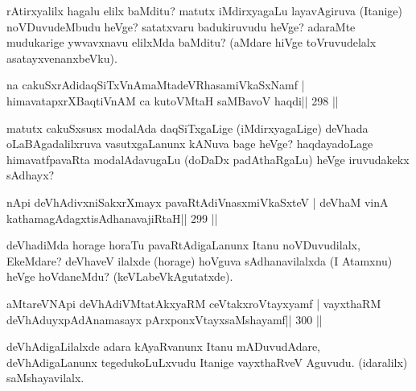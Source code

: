 \begin{artha}
rAtirxyalilx hagalu elilx baMditu? matutx iMdirxyagaLu layavAgiruva (Itanige) noVDuvudeMbudu heVge? satatxvaru badukiruvudu heVge? adaraMte mudukarige ywvavxnavu elilxMda baMditu? (aMdare hiVge toVruvudelalx asatayxvenanxbeVku).
\end{artha}


\begin{shl}
na cakuSxrAdidaqSiTxVnAmaMtadeVRhasamiVkaSxNamf |
himavatapxrXBaqtiVnAM ca kutoV\s MtaH saMBavoV haqdi\hfill || 298 ||
\end{shl}

\begin{artha}
matutx cakuSxsusx modalAda daqSiTxgaLige (iMdirxyagaLige) deVhada oLaBAga\-dalilxruva vasutxgaLanunx kANuva bage heVge? haqdayadoLage himavatfpavaRta modalAdavugaLu (doDaDx padAthaRgaLu) heVge iruvudakekx sAdhayx?
\end{artha}


\begin{shl}
nApi deVhAdivxniSakxrXmayx pavaRtAdiVnasxmiVkaSxteV |
deVhaM vinA kathamagAdagxtisAdhanavajiRtaH\hfill || 299 ||
\end{shl}

\begin{artha}
deVhadiMda horage horaTu pavaRtAdigaLanunx Itanu noVDuvudilalx, EkeMdare? deVhaveV ilalxde (horage) hoVguva sAdhanavilalxda (I Atamxnu) heVge hoVdaneMdu? (keVLabeVkAgutatxde).
\end{artha}


\begin{shl}
aMtareVNApi deVhAdiVMtatAkxyaRM ceVtakxroVtayxyamf |
vayxthaRM deVhAduyxpAdAnamasayx pArxponxVtayxsaMshayamf\hfill || 300 ||
\end{shl}

\begin{artha}
deVhAdigaLilalxde adara kAyaRvanunx Itanu mADuvudAdare, deVhAdi\-gaLanunx tegedukoLuLxvudu Itanige vayxthaRveV Aguvudu. (idaralilx) saMshayavilalx.
\end{artha}

